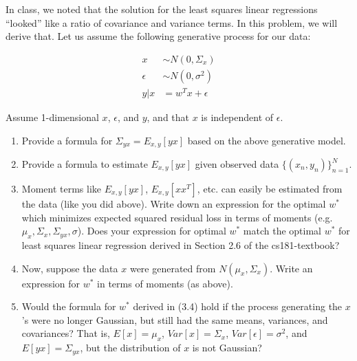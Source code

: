 \documentclass[submit]{harvardml}
\begin{document}
\newpage 


\begin{problem}

In class, we noted that the solution for the least squares linear regressions ``looked'' like a ratio of covariance and variance terms.  In this problem, we will derive that.  Let us assume the following generative process for our data:

\begin{eqnarray*}
  x &\sim N(0,\Sigma_x) \\
  \epsilon &\sim N(0,\sigma^2)\\
  y | x &= w^Tx + \epsilon 
  \end{eqnarray*}
  
Assume 1-dimensional $x$, $\epsilon$, and $y$, and that $x$ is independent of $\epsilon$.

\begin{enumerate}

\item Provide a formula for $\Sigma_{yx} = E_{x, y}[yx]$ based on the above generative model.

\item Provide a formula to estimate $E_{x, y}[yx]$ given observed data $\{(x_n,y_n)\}_{n=1}^N$.

\item Moment terms like $E_{x, y}[yx]$, $E_{x, y}[xx^T]$, etc. can easily be
  estimated from the data (like you did above).  Write down an
  expression for the optimal $w^*$ which minimizes expected squared residual loss 
  in terms of moments
  (e.g. $\mu_x,\Sigma_x,\Sigma_{yx},\sigma$). Does your expression for optimal $w^*$ match the optimal $w^*$ for least squares linear regression derived in Section 2.6 of the cs181-textbook?

\item Now, suppose the data $x$ were generated from
  $N(\mu_x,\Sigma_x)$.  Write an expression for $w^*$ in terms of
  moments (as above).  
  
\item Would the formula for $w^*$ derived in (3.4) hold if the process generating the $x$'s
  were no longer Gaussian, but still had the same means, variances, and covariances?
  That is, $E[x]=\mu_x$, $Var[x]=\Sigma_x$, $Var[\epsilon] = \sigma^2$, and $E[yx] = \Sigma_{y x}$, but the distribution of $x$
  is not Gaussian?  
  
\end{enumerate}

\end{problem}
\end{document}
